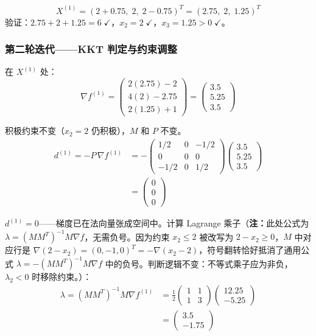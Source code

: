{\[
X^{(1)} = (2+0.75,\; 2,\; 2-0.75)^T = (2.75,\; 2,\; 1.25)^T
\]
验证：$2.75+2+1.25 = 6\;\checkmark$，$x_2=2\;\checkmark$，$x_3=1.25>0\;\checkmark$。

\subsubsection{第二轮迭代——KKT 判定与约束调整}

在 $X^{(1)}$ 处：
\[
\nabla f^{(1)} = \begin{pmatrix} 2(2.75)-2 \\ 4(2)-2.75 \\ 2(1.25)+1 \end{pmatrix} = \begin{pmatrix} 3.5 \\ 5.25 \\ 3.5 \end{pmatrix}
\]

积极约束不变（$x_2=2$ 仍积极），$M$ 和 $P$ 不变。
\[
\begin{aligned}
d^{(1)} = -P\,\nabla f^{(1)}
&= -\begin{pmatrix} 1/2 & 0 & -1/2 \\ 0 & 0 & 0 \\ -1/2 & 0 & 1/2 \end{pmatrix}\begin{pmatrix}3.5\\5.25\\3.5\end{pmatrix} \\
&= \begin{pmatrix} 0 \\ 0 \\ 0 \end{pmatrix}
\end{aligned}
\]

$d^{(1)} = 0$——梯度已在法向量张成空间中。计算 Lagrange 乘子（\textbf{注：}此处公式为 $\lambda = (MM^T)^{-1}M\nabla f$，无需负号。因为约束 $x_2\le2$ 被改写为 $2-x_2\ge0$，$M$ 中对应行是 $\nabla(2-x_2)=(0,-1,0)^T=-\nabla(x_2-2)$，符号翻转恰好抵消了通用公式 $\lambda=-(MM^T)^{-1}M\nabla f$ 中的负号。判断逻辑不变：不等式乘子应为非负，$\lambda_2<0$ 时移除约束。）：
\[
\begin{aligned}
\lambda = (MM^T)^{-1} M \nabla f^{(1)}
&= \frac{1}{2}\begin{pmatrix}1&1\\1&3\end{pmatrix}\begin{pmatrix}12.25\\-5.25\end{pmatrix} \\
&= \begin{pmatrix} 3.5 \\ -1.75 \end{pmatrix}
\end{aligned}
\]

}
